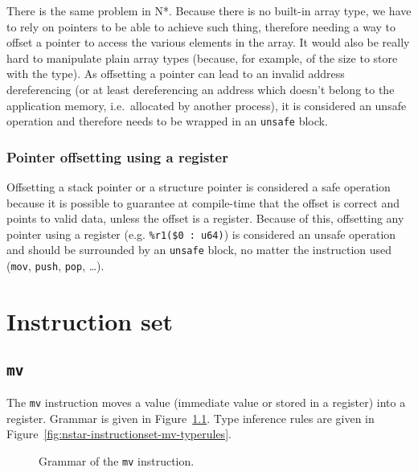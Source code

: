 There is the same problem in N*.
Because there is no built-in array type, we have to rely on pointers to be able to achieve such thing, therefore needing a way to offset a pointer to access the various elements in the array.
It would also be really hard to manipulate plain array types (because, for example, of the size to store with the type).
As offsetting a pointer can lead to an invalid address dereferencing (or at least dereferencing an address which doesn't belong to the application memory, i.e.\ allocated by another process), it is considered an unsafe operation and therefore needs to be wrapped in an \texttt{unsafe} block.

\subsection{Pointer offsetting using a register}\label{subsec:nstar-common-unsafe-ptroffsetreg}

Offsetting a stack pointer or a structure pointer is considered a safe operation because it is possible to guarantee at compile-time that the offset is correct and points to valid data, unless the offset is a register.
Because of this, offsetting any pointer using a register (e.g. \texttt{\%r1(\$0 : u64)}) is considered an unsafe operation and should be surrounded by an \texttt{unsafe} block, no matter the instruction used (\texttt{mov}, \texttt{push}, \texttt{pop}, \ldots).

\chapter{Instruction set}\label{chap:nstar-instructionset}

\section{\texttt{mv}}\label{sec:nstar-instructionset-mv}

The \texttt{mv} instruction moves a value (immediate value or stored in a register) into a register.
Grammar is given in Figure~\ref{fig:nstar-instructionset-mv-grammar}.
Type inference rules are given in Figure~\ref{fig:nstar-instructionset-mv-typerules}.

\begin{figure}[H]
  \centering
  \caption{Grammar of the \texttt{mv} instruction.}
  \label{fig:nstar-instructionset-mv-grammar}
\end{figure}

